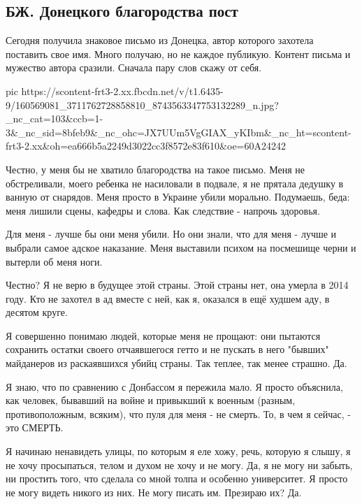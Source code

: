  
 
 
 
 
\subsection{БЖ. Донецкого благородства пост}

Сегодня получила знаковое письмо из Донецка, автор которого захотела поставить
свое имя. Много получаю, но не каждое публикую. Контент письма и мужество
автора сразили. Сначала пару слов скажу от себя.

\ifcmt
  pic https://scontent-frt3-2.xx.fbcdn.net/v/t1.6435-9/160569081_3711762728858810_8743563347753132289_n.jpg?_nc_cat=103&ccb=1-3&_nc_sid=8bfeb9&_nc_ohc=JX7UUm5VgGIAX_yKIbm&_nc_ht=scontent-frt3-2.xx&oh=ea666b5a2249d3022cc3f8572e83f610&oe=60A24242
\fi

Честно, у меня бы не хватило благородства на такое письмо. Меня не
обстреливали, моего ребенка не насиловали в подвале, я не прятала дедушку в
ванную от снарядов. Меня просто в Украине убили морально. Подумаешь, беда: меня
лишили сцены, кафедры и слова. Как следствие - напрочь здоровья. 

Для меня - лучше бы они меня убили. Но они знали, что для меня - лучше и
выбрали самое адское наказание. Меня выставили психом на посмешище черни и
вытерли об меня ноги. 

Честно? Я не верю в будущее этой страны. Этой страны нет, она умерла в 2014
году. Кто не захотел в ад вместе с ней, как я, оказался в ещё худшем аду, в
десятом круге. 

Я совершенно понимаю людей, которые меня не прощают: они пытаются сохранить
остатки своего отчаявшегося гетто и не пускать в него "бывших" майданеров из
раскаявшихся убийц страны. Так теплее, так менее страшно. Да.

Я знаю, что по сравнению с Донбассом я пережила мало. Я просто объяснила, как
человек, бывавший на войне и привыкший к военным (разным, противоположным,
всяким), что пуля для меня - не смерть. То, в чем я сейчас, - это СМЕРТЬ. 

Я начинаю ненавидеть улицы, по которым я еле хожу, речь, которую я слышу, я не
хочу просыпаться, телом и духом не хочу и не могу. Да, я не могу ни забыть, ни
простить того, что сделала со мной толпа и особенно университет. Я просто не
могу видеть никого из них. Не могу писать им. Презираю их? Да. 

